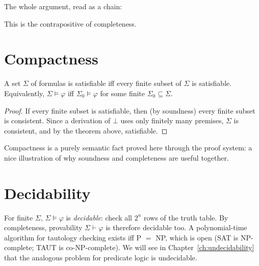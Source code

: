 The whole argument, read as a chain:
\begin{center}
\end{center}
This is the contrapositive of completeness.

\section{Compactness}

\begin{theorem}[Compactness]
A set $\Sigma$ of formulas is satisfiable iff every finite subset of $\Sigma$ is
satisfiable. Equivalently, $\Sigma\models\varphi$ iff $\Sigma_0\models\varphi$ for some
finite $\Sigma_0\subseteq\Sigma$.
\end{theorem}
\begin{proof}
If every finite subset is satisfiable, then (by soundness) every finite subset is
consistent. Since a derivation of $\bot$ uses only finitely many premises, $\Sigma$ is
consistent, and by the theorem above, satisfiable.
\end{proof}

Compactness is a purely semantic fact proved here through the proof system: a nice
illustration of why soundness and completeness are useful together.

\section{Decidability}

For finite $\Sigma$, $\Sigma\models\varphi$ is \emph{decidable}: check all $2^n$ rows of the
truth table. By completeness, provability $\Sigma\vdash\varphi$ is therefore decidable too.
A polynomial-time algorithm for tautology checking exists iff P $=$ NP, which is
open (SAT is NP-complete; TAUT is co-NP-complete).
We will see in Chapter~\ref{ch:undecidability} that the analogous problem for predicate
logic is undecidable.

